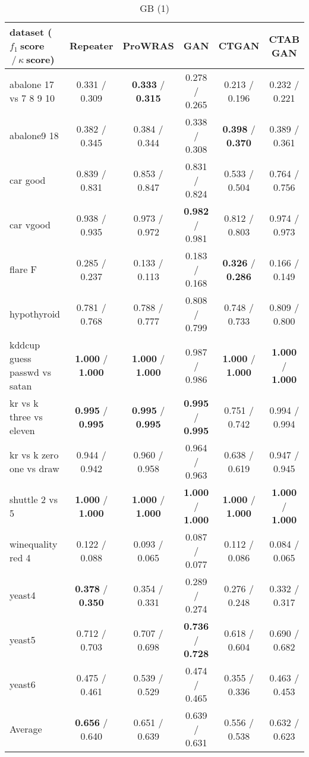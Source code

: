\begin{table*}[ht]\scriptsize\caption{GB (1)}\label{tab:results:GB:A}\centering\tabularnewline
\begin{tabular}{l|@{\hskip3pt}c@{\hskip3pt}|@{\hskip3pt}c@{\hskip3pt}|@{\hskip3pt}c@{\hskip3pt}|@{\hskip3pt}c@{\hskip3pt}|@{\hskip3pt}c@{\hskip3pt}}\hline
\textbf{dataset ($f_1~$score$~/~\kappa~$score)} & \textbf{Repeater} & \textbf{ProWRAS} & \textbf{GAN} & \textbf{CTGAN} & \textbf{CTAB GAN}
\tabularnewline
\hline
abalone 17 vs 7 8 9 10 &  0.331  /  0.309  &  \textbf{0.333}  /  \textbf{0.315}  &  0.278  /  0.265  &  0.213  /  0.196  &  0.232  /  0.221 
\tabularnewline
abalone9 18 &  0.382  /  0.345  &  0.384  /  0.344  &  0.338  /  0.308  &  \textbf{0.398}  /  \textbf{0.370}  &  0.389  /  0.361 
\tabularnewline
car good &  0.839  /  0.831  &  0.853  /  0.847  &  0.831  /  0.824  &  0.533  /  0.504  &  0.764  /  0.756 
\tabularnewline
car vgood &  0.938  /  0.935  &  0.973  /  0.972  &  \textbf{0.982}  /  0.981  &  0.812  /  0.803  &  0.974  /  0.973 
\tabularnewline
flare F &  0.285  /  0.237  &  0.133  /  0.113  &  0.183  /  0.168  &  \textbf{0.326}  /  \textbf{0.286}  &  0.166  /  0.149 
\tabularnewline
hypothyroid &  0.781  /  0.768  &  0.788  /  0.777  &  0.808  /  0.799  &  0.748  /  0.733  &  0.809  /  0.800 
\tabularnewline
kddcup guess passwd vs satan &  \textbf{1.000}  /  \textbf{1.000}  &  \textbf{1.000}  /  \textbf{1.000}  &  0.987  /  0.986  &  \textbf{1.000}  /  \textbf{1.000}  &  \textbf{1.000}  /  \textbf{1.000} 
\tabularnewline
kr vs k three vs eleven &  \textbf{0.995}  /  \textbf{0.995}  &  \textbf{0.995}  /  \textbf{0.995}  &  \textbf{0.995}  /  \textbf{0.995}  &  0.751  /  0.742  &  0.994  /  0.994 
\tabularnewline
kr vs k zero one vs draw &  0.944  /  0.942  &  0.960  /  0.958  &  0.964  /  0.963  &  0.638  /  0.619  &  0.947  /  0.945 
\tabularnewline
shuttle 2 vs 5 &  \textbf{1.000}  /  \textbf{1.000}  &  \textbf{1.000}  /  \textbf{1.000}  &  \textbf{1.000}  /  \textbf{1.000}  &  \textbf{1.000}  /  \textbf{1.000}  &  \textbf{1.000}  /  \textbf{1.000} 
\tabularnewline
winequality red 4 &  0.122  /  0.088  &  0.093  /  0.065  &  0.087  /  0.077  &  0.112  /  0.086  &  0.084  /  0.065 
\tabularnewline
yeast4 &  \textbf{0.378}  /  \textbf{0.350}  &  0.354  /  0.331  &  0.289  /  0.274  &  0.276  /  0.248  &  0.332  /  0.317 
\tabularnewline
yeast5 &  0.712  /  0.703  &  0.707  /  0.698  &  \textbf{0.736}  /  \textbf{0.728}  &  0.618  /  0.604  &  0.690  /  0.682 
\tabularnewline
yeast6 &  0.475  /  0.461  &  0.539  /  0.529  &  0.474  /  0.465  &  0.355  /  0.336  &  0.463  /  0.453 
\tabularnewline
\hline Average &  \textbf{0.656}  /  0.640  &  0.651  /  0.639  &  0.639  /  0.631  &  0.556  /  0.538  &  0.632  /  0.623 
\tabularnewline
\hline\end{tabular}\end{table*}


